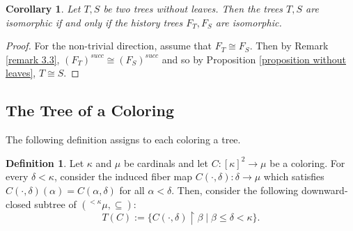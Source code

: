 \documentclass[11pt]{amsart}
\theoremstyle{plain}
\newtheorem{corollary}[theorem]{Corollary}
\theoremstyle{definition} %
\newtheorem{definition}[theorem]{Definition}
\theoremstyle{remark}
\begin{document}
\begin{corollary}\label{corollary reconstruction a tree from its history}
Let $T,S$ be two trees without leaves. Then the trees $T,S$ are isomorphic if and only if the history trees $F_T,F_S$ are isomorphic.
\end{corollary}

\begin{proof}
For the non-trivial direction, assume that $F_T \cong F_S$. Then by Remark \ref{remark 3.3}, $(F_T)^{succ} \cong (F_S)^{succ}$ and so by Proposition \ref{proposition without leaves}, $T \cong S$.
\end{proof}


















































\subsection{The Tree of a Coloring}
The following definition assigns to each coloring a tree.
\begin{definition}\label{definition T(C)}\cite[Page 7]{ri:chain}
Let $\kappa$ and $\mu$ be cardinals and let $C:[\kappa]^2 \to \mu$ be a coloring. For every $\delta<\kappa$, consider the induced fiber map $C(\cdot,\delta):\delta\rightarrow\mu$ which satisfies $C(\cdot,\delta)(\alpha)=C(\alpha,\delta)$ for all $\alpha<\delta$.
Then, consider the following downward-closed subtree of $({}^{<\kappa}\mu,\subseteq)$:
$$  T(C):=\{ C(\cdot,\delta)\restriction\beta\mid \beta\le\delta<\kappa\}.%
$$
\end{definition}
\end{document}
